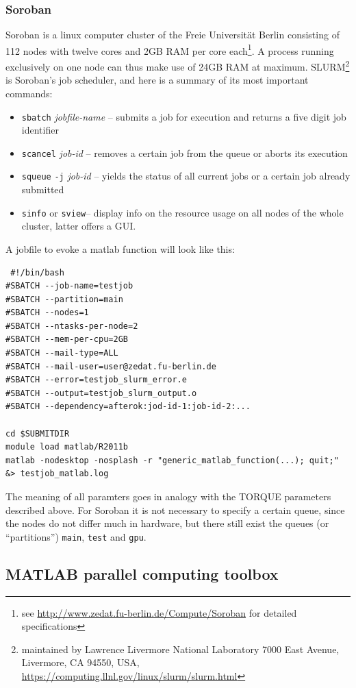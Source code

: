 \documentclass[11.5pt,a4paper]{article}
\begin{document}
\subsubsection{Soroban}
Soroban is a linux computer cluster of the Freie Universit\"at Berlin consisting of 112 nodes with twelve cores and 2GB RAM per core each\footnote{see \url{http://www.zedat.fu-berlin.de/Compute/Soroban} for detailed specifications}. A process running exclusively on one node can thus make use of 24GB RAM at maximum. SLURM\footnote{maintained by Lawrence Livermore National Laboratory 7000 East Avenue, Livermore, CA 94550, USA, \url{https://computing.llnl.gov/linux/slurm/slurm.html}} is Soroban's job scheduler, and here is a summary of its most important commands:
\begin{itemize}
 \item \verb$sbatch$ \emph{jobfile-name} -- submits a job for execution and returns a five digit job identifier
  \item \verb$scancel$ \emph{job-id} -- removes a certain job from the queue or aborts its execution
  \item \verb$squeue$ {\verb$-j$ \emph{job-id}} -- yields the status of all current jobs {or a certain job already submitted}
  \item \verb$sinfo$ or \verb$sview$-- display info on the resource usage on all nodes of the whole cluster, latter offers a GUI.
\end{itemize}
A jobfile to evoke a matlab function will look like this:
\begin{lstlisting}
 #!/bin/bash 
#SBATCH --job-name=testjob
#SBATCH --partition=main
#SBATCH --nodes=1 
#SBATCH --ntasks-per-node=2 
#SBATCH --mem-per-cpu=2GB
#SBATCH --mail-type=ALL
#SBATCH --mail-user=user@zedat.fu-berlin.de 
#SBATCH --error=testjob_slurm_error.e
#SBATCH --output=testjob_slurm_output.o 
#SBATCH --dependency=afterok:jod-id-1:job-id-2:...

cd $SUBMITDIR
module load matlab/R2011b
matlab -nodesktop -nosplash -r "generic_matlab_function(...); quit;" &> testjob_matlab.log                                                                                   
\end{lstlisting}
The meaning of all paramters goes in analogy with the TORQUE parameters described above. For Soroban it is not necessary to specify a certain queue, since the nodes do not differ much in hardware, but there still exist the queues (or ``partitions'') \verb$main$, \verb$test$ and \verb$gpu$.

\subsection{MATLAB parallel computing toolbox}
\end{document}
